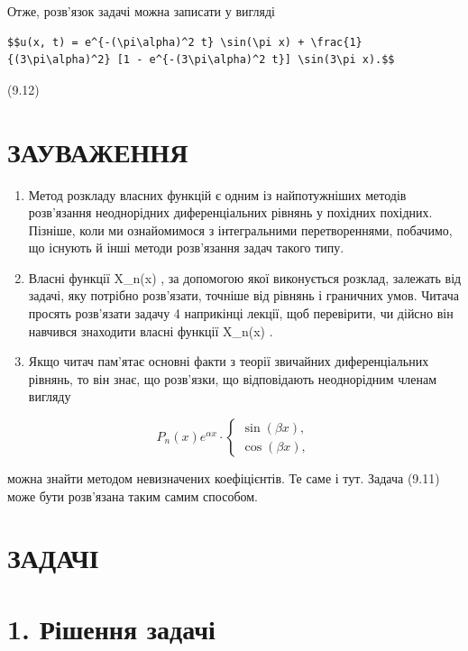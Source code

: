 \documentclass[
  ukrainian,
]{article}
\begin{document}
Отже, розв'язок задачі можна записати у вигляді

\begin{verbatim}
$$u(x, t) = e^{-(\pi\alpha)^2 t} \sin(\pi x) + \frac{1}{(3\pi\alpha)^2} [1 - e^{-(3\pi\alpha)^2 t}] \sin(3\pi x).$$
\end{verbatim}

(9.12)

\section{ЗАУВАЖЕННЯ}\label{ux437ux430ux443ux432ux430ux436ux435ux43dux43dux44f-6}

\begin{enumerate}
\def\labelenumi{\arabic{enumi}.}
\item
  Метод розкладу власних функцій є одним із найпотужніших методів
  розв'язання неоднорідних диференціальних рівнянь у похідних похідних.
  Пізніше, коли ми ознайомимося з інтегральними перетвореннями,
  побачимо, що існують й інші методи розв'язання задач такого типу.
\item
  Власні функції X\_n(x) , за допомогою якої виконується розклад,
  залежать від задачі, яку потрібно розв'язати, точніше від рівнянь і
  граничних умов. Читача просять розв'язати задачу 4 наприкінці лекції,
  щоб перевірити, чи дійсно він навчився знаходити власні функції
  X\_n(x) .
\item
  Якщо читач пам'ятає основні факти з теорії звичайних диференціальних
  рівнянь, то він знає, що розв'язки, що відповідають неоднорідним
  членам вигляду
\end{enumerate}

\[
P_n(x) e^{\alpha x} \cdot
\begin{cases} \sin{(\beta x)}, \\ \cos{(\beta x)}, \end{cases}
\]

можна знайти методом невизначених коефіцієнтів. Те саме і тут. Задача
(9.11) може бути розв'язана таким самим способом.

\section{ЗАДАЧІ}\label{ux437ux430ux434ux430ux447ux456}

\section{1. Рішення
задачі}\label{ux440ux456ux448ux435ux43dux43dux44f-ux437ux430ux434ux430ux447ux456}
\end{document}
